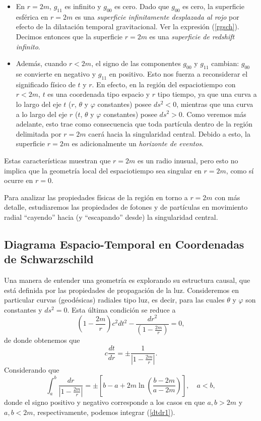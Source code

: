 \begin{itemize}
\item En $r=2m$, $g_{11}$ es infinito y $g_{00}$ es cero. Dado que $g_{00}
$ es cero, la superficie esférica en $r=2m$ es una \textit{superficie
infinitamente desplazada al rojo} por efecto de la dilatación temporal gravitacional. Ver la expresión (\ref{rgsch}). Decimos entonces que la superficie $r=2m$ es una \textit{superficie de redshift infinito}.

\item Además, cuando $r<2m$, el signo de las componentes $g_{00}$ y $g_{11}$ cambian: $g_{00}$ se convierte en negativo y $g_{11}$ en positivo. Esto nos fuerza a reconsiderar el significado físico de $t$ y $r$. En efecto, en la región del espaciotiempo con $r<2m$, $t$ es una coordenada tipo espacio y $r$ tipo tiempo, ya que una curva a lo largo del eje $t$ ($r$, $\theta$ y $\varphi$ constantes) posee $ds^2<0$, mientras que una curva a lo largo del eje $r$ ($t$, $\theta$ y $\varphi$ constantes) posee $ds^2>0$. Como veremos más adelante, esto trae como consecuencia que toda partícula dentro de la región delimitada por $r=2m$ caerá hacia la singularidad central. Debido a esto, la superficie $r=2m$ es adicionalmente un \textit{horizonte de eventos}.
\end{itemize}

Estas características muestran que $r=2m$ es un radio inusual, pero
esto no implica que la geometría local del espaciotiempo sea
singular en $r=2m$, como sí ocurre en $r=0$.

Para analizar las propiedades físicas de la región en torno a $r=2m$ con más detalle, estudiaremos las propiedades de fotones y de partículas en movimiento radial ``cayendo'' hacia (y ``escapando'' desde) la singularidad central.

\subsection{Diagrama Espacio-Temporal en Coordenadas de Schwarzschild}

Una manera de entender una geometría es explorando su estructura causal, que está definida por las propiedades de propagación de la luz. Consideremos en particular curvas (geodésicas)
radiales tipo luz, es decir, para las cuales $\theta$ y $\varphi$ son constantes y
$ds^2=0$. Esta última condición se reduce a
\begin{equation}
 \left(1-\frac{2m}{r}\right) c^2dt^2-\frac{dr^2}{\left( 1-\frac
{2m}{r}\right) }=0,
\end{equation}
de donde obtenemos que
\begin{equation}
 c\frac{dt}{dr}=\pm\frac{1}{\left| 1-\frac{2m}{r}\right|}. \label{dtdr1}
\end{equation}
Considerando que
\begin{equation}
 \int_a^b\frac{dr}{\left| 1-\frac{2m}{r}\right|}=\pm\left[b-a+2m\ln\left(\frac{b-2m}{a-2m}\right)\right], \quad a<b,
\end{equation}
donde el signo positivo y negativo corresponde a los casos en que $a,b>2m$ y $a,b<2m$, respectivamente, podemos integrar (\ref{dtdr1}).

